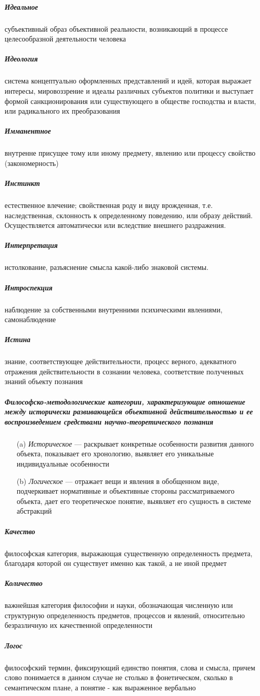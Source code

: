 \documentclass[a4paper, 12pt]{article}
\theoremstyle{plain} %
\theoremstyle{definition} %
\theoremstyle{remark} %
\begin{document}
\subparagraph{Идеальное}
	субъективный образ объективной реальности, возникающий в процессе целесообразной деятельности человека

\subparagraph{Идеология}
	система концептуально оформленных представлений и идей, которая выражает интересы, мировоззрение и идеалы различных субъектов политики и выступает формой санкционирования или существующего в обществе господства и власти, или радикального их преобразования

\subparagraph{Имманентное}
	внутренне присущее тому или иному предмету, явлению или процессу свойство (закономерность)

\subparagraph{Инстинкт}
	естественное влечение; свойственная роду и виду врожденная, т.е. наследственная, склонность к определенному поведению, или образу действий. Осуществляется автоматически или вследствие внешнего раздражения.

\subparagraph{Интерпретация}
	 истолкование, разъяснение смысла какой-либо знаковой системы.

\subparagraph{Интроспекция}
	наблюдение за собственными внутренними психическими явлениями, самонаблюдение

\subparagraph{Истина}
	знание, соответствующее действительности, процесс верного, адекватного отражения действительности в сознании человека, соответствие полученных знаний объекту познания

\subparagraph{Философско-методологические категории, характеризующие отношение между исторически развивающейся объективной действительностью и ее воспроизведением средствами научно-теоретического познания}
\begin{itemize}
	\item[(a)] \emph{Историческое} --- раскрывает конкретные особенности развития данного объекта, показывает его хронологию, выявляет его уникальные индивидуальные особенности
	\item[(b)] \emph{Логическое} --- отражает вещи и явления в обобщенном виде, подчеркивает нормативные и объективные стороны рассматриваемого объекта, дает его теоретическое понятие, выявляет его сущность в системе абстракций
\end{itemize}

\subparagraph{Качество}
	философская категория, выражающая существенную определенность предмета, благодаря которой он существует именно как такой, а не иной предмет

\subparagraph{Количество}
	важнейшая категория философии и науки, обозначающая численную или структурную определенность предметов, процессов и явлений, относительно безразличную их качественной определенности

\subparagraph{Логос}
	философский термин, фиксирующий единство понятия, слова и смысла, причем слово понимается в данном случае не столько в фонетическом, сколько в семантическом плане, а понятие - как выраженное вербально
\end{document}
